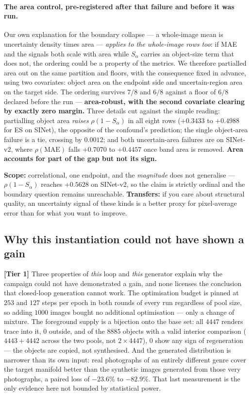 \documentclass{article} %
\begin{document}
\paragraph{The area control, pre-registered after that failure and before it was run.} Our own
explanation for the boundary collapse --- a whole-image mean is uncertainty density times area ---
\emph{applies to the whole-image rows too}: if MAE and the signals both scale with area while
$S_\alpha$ carries an object-size term that does not, the ordering could be a property of the metrics.
We therefore partialled area out on the same partition and floors, with the consequence fixed in
advance, using two covariates: object area on the endpoint side and uncertain-region area on the
target side. The ordering survives $7/8$ and $6/8$ against a floor of $6/8$ declared before the run
--- \textbf{area-robust, with the second covariate clearing by exactly zero margin.} Three details cut
against the simple reading: partialling object area \emph{raises} $\rho(1-S_\alpha)$ in all eight rows
($+0.3433$ to $+0.4988$ for ES on SINet), the opposite of the confound's prediction; the single
object-area failure is a tie, crossing by $0.0012$; and both uncertain-area failures are on SINet-v2,
where $\rho(\mathrm{MAE})$ falls $+0.7070$ to $+0.4457$ once band area is removed.
\textbf{Area accounts for part of the gap but not its sign.}

\textbf{Scope:} correlational, one endpoint, and the \emph{magnitude} does not generalise ---
$\rho(1-S_\alpha)$ reaches $+0.5628$ on SINet-v2, so the claim is strictly ordinal and the boundary
question remains unreachable. \textbf{Transfers:} if you care about structural quality, an uncertainty
signal of these kinds is a better proxy for pixel-average error than for what you want to improve.

\subsection{Why this instantiation could not have shown a gain}
\label{sec:diss-instantiation}

\textbf{[Tier 1]} Three properties of \emph{this} loop and \emph{this} generator explain why the
campaign could not have demonstrated a gain, and none licenses the conclusion that closed-loop
generation cannot work. The optimisation budget is pinned at $253$ and $127$ steps per epoch in both
rounds of every run regardless of pool size, so adding $1000$ images bought no additional optimisation
--- only a change of mixture. The foreground supply is a bijection onto the base set: all $4447$
renders trace into it, $0$ outside, and of the $8885$ objects with a valid interior comparison
($4443+4442$ across the two pools, not $2 \times 4447$), $0$ show any sign of regeneration --- the
objects are copied, not synthesised. And the generated distribution is narrower than its own input:
real photographs of an entirely different genre cover the target manifold better than the synthetic
images generated from those very photographs, a paired loss of $-23.6\%$ to $-82.9\%$. That last
measurement is the only evidence here not bounded by statistical power.
\end{document}
